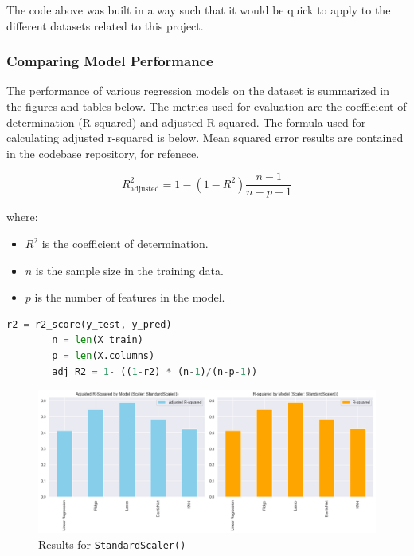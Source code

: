 \documentclass{article}
\theoremstyle{mytheoremstyle}
\theoremstyle{mytheoremstyle}
\theoremstyle{myproblemstyle}
\begin{document}
The code above was built in a way such that it would be quick to apply to the different datasets related to this project. 

\pagebreak

\subsubsection{Comparing Model Performance}

The performance of various regression models on the dataset is summarized in the figures and tables below. The metrics used for evaluation are the coefficient of determination (R-squared) and adjusted R-squared. The formula used for calculating adjusted r-squared is below. Mean squared error results are contained in the codebase repository, for refenece. 



    \[
R_{\text{adjusted}}^2 = 1 - (1 - R^2) \frac{n - 1}{n - p - 1}\]

where:
\begin{itemize}
    \item $R^2$ is the coefficient of determination.
    \item $n$ is the sample size in the training data.
    \item $p$ is the number of features in the model.
\end{itemize}

\begin{lstlisting}[language=Python, caption=R-squared computation within evaluation function]
        r2 = r2_score(y_test, y_pred)
        n = len(X_train)
        p = len(X.columns)
        adj_R2 = 1- ((1-r2) * (n-1)/(n-p-1))
\end{lstlisting}


\begin{figure}[htbp]
\centering
\includegraphics[width=\linewidth]{./Images/evalRegModelStandardScaler.png}
\caption{Results for \texttt{StandardScaler()}}
\label{fig:Standard Scaler Results}
\end{figure}
\end{document}
